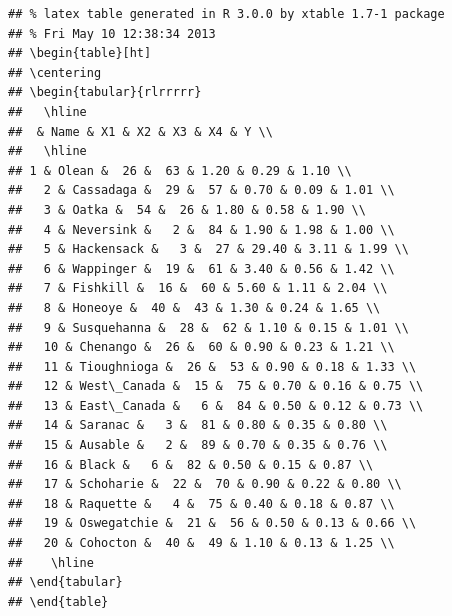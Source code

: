 \documentclass{article}\usepackage{graphicx, color}
\makeatletter
\newenvironment{kframe}{%
 \def\at@end@of@kframe{}%
 \ifinner\ifhmode%
  \def\at@end@of@kframe{\end{minipage}}%
  \begin{minipage}{\columnwidth}%
 \fi\fi%
 \def\FrameCommand##1{\hskip\@totalleftmargin \hskip-\fboxsep
 \colorbox{shadecolor}{##1}\hskip-\fboxsep
     \hskip-\linewidth \hskip-\@totalleftmargin \hskip\columnwidth}%
 \MakeFramed {\advance\hsize-\width
   \@totalleftmargin\z@ \linewidth\hsize
   \@setminipage}}%
 {\par\unskip\endMakeFramed%
 \at@end@of@kframe}
\newenvironment{knitrout}{}{} %
\numberwithin{equation}{section}
\makeatother
\begin{document}
\begin{flushleft}
\begin{enumerate}[1. ]
\begin{center}
\begin{knitrout}
\color{fgcolor}\begin{kframe}
\begin{verbatim}
## % latex table generated in R 3.0.0 by xtable 1.7-1 package
## % Fri May 10 12:38:34 2013
## \begin{table}[ht]
## \centering
## \begin{tabular}{rlrrrrr}
##   \hline
##  & Name & X1 & X2 & X3 & X4 & Y \\ 
##   \hline
## 1 & Olean &  26 &  63 & 1.20 & 0.29 & 1.10 \\ 
##   2 & Cassadaga &  29 &  57 & 0.70 & 0.09 & 1.01 \\ 
##   3 & Oatka &  54 &  26 & 1.80 & 0.58 & 1.90 \\ 
##   4 & Neversink &   2 &  84 & 1.90 & 1.98 & 1.00 \\ 
##   5 & Hackensack &   3 &  27 & 29.40 & 3.11 & 1.99 \\ 
##   6 & Wappinger &  19 &  61 & 3.40 & 0.56 & 1.42 \\ 
##   7 & Fishkill &  16 &  60 & 5.60 & 1.11 & 2.04 \\ 
##   8 & Honeoye &  40 &  43 & 1.30 & 0.24 & 1.65 \\ 
##   9 & Susquehanna &  28 &  62 & 1.10 & 0.15 & 1.01 \\ 
##   10 & Chenango &  26 &  60 & 0.90 & 0.23 & 1.21 \\ 
##   11 & Tioughnioga &  26 &  53 & 0.90 & 0.18 & 1.33 \\ 
##   12 & West\_Canada &  15 &  75 & 0.70 & 0.16 & 0.75 \\ 
##   13 & East\_Canada &   6 &  84 & 0.50 & 0.12 & 0.73 \\ 
##   14 & Saranac &   3 &  81 & 0.80 & 0.35 & 0.80 \\ 
##   15 & Ausable &   2 &  89 & 0.70 & 0.35 & 0.76 \\ 
##   16 & Black &   6 &  82 & 0.50 & 0.15 & 0.87 \\ 
##   17 & Schoharie &  22 &  70 & 0.90 & 0.22 & 0.80 \\ 
##   18 & Raquette &   4 &  75 & 0.40 & 0.18 & 0.87 \\ 
##   19 & Oswegatchie &  21 &  56 & 0.50 & 0.13 & 0.66 \\ 
##   20 & Cohocton &  40 &  49 & 1.10 & 0.13 & 1.25 \\ 
##    \hline
## \end{tabular}
## \end{table}
\end{verbatim}
\end{kframe}
\end{knitrout}


\end{center}
\end{enumerate}
\end{flushleft}
\end{document}
